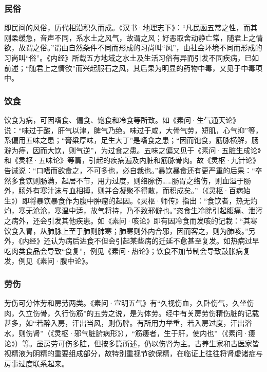\documentclass[12pt]{ctexbook}
\begin{document}
\subsubsection{民俗}%

即民间的风俗，历代相沿积久而成。《汉书·地理志下》：“凡民函五常之性，而其刚柔缓急，音声不同，系水土之风气，故谓之风；好恶取舍动静亡常，随君上之情欲，故谓之俗。”谓由自然条件不同而形成的习尚叫“风”，由社会环境不同而形成的习尚叫“俗”。《内经》所载五方地域之水土及生活习俗有异而引发不同疾病，已如前述；“随君上之情欲”而兴起服石之风，其后果为明显的药物中毒，又见于中毒项中。

\subsubsection{饮食}%

饮食为病，可因嗜食、偏食、饱食和冷食等所致。如《素问·生气通天论》说：“味过于酸，肝气以津，脾气乃绝。味过于咸，大骨气劳，短肌，心气抑”等，系偏用五味之患；“膏粱厚味，足生大丁”是嗜食之患；“因而饱食，筋脉横解，肠澼为痔，因而大饮，则气逆”，为过食之患。五味之偏又见于《素问·五脏生成论》和《灵枢·五味论》等篇，引起的疾病遍及内脏和筋脉骨肉。故《灵枢·九针论》告诫说：“口嗜而欲食之，不可多也，必自裁也。”暴饮暴食还有更严重的后果：“卒然多食饮则肠满，起居不节，用力过度，则络脉伤……肠胃之络伤，则血溢于肠外，肠外有寒汁沫与血相搏，则并合凝聚不得散，而积成矣。”（《灵枢·百病始生》）即将暴饮暴食作为腹中肿瘤的起因。《灵枢·师传》指出：“食饮者，热无灼灼，寒无沧沧，寒温中适，故气将持，乃不致邪僻也。”恣食生冷除引起腹痛、泄泻之病外，还会引发其他疾患。如《素问·咳论》即有因冷食而发咳的记栽：“其寒饮食入胃，从肺脉上至于肺则肺寒；肺寒则外内合邪，因而客之，则为肺咳。”另外，《内经》还认为病后进食不但会引起某些病的迁延不愈甚至复发。如热病过早吃肉类食品会导致“食复”，例见《素问·热论》；饮食不加节制会导致鼓胀病复发，例见《素问·腹中论》。

\subsubsection{劳伤}%

劳伤可分体劳和房劳两类。《素问·宣明五气》有“久视伤血，久卧伤气，久坐伤肉，久立伤骨，久行伤筋”的五劳之说，是为体劳。经中有关房劳伤精伤脏的记载甚多，如“若醉入房，汗出当风，则伤脾。有所用力举重，若入房过度，汗出浴水，则伤肾”（《灵枢·邪气脏腑病形》），“筋痿者，生于肝，使内也”（《素问·痿论》）等。虽房劳可伤多脏，但按多篇所述，仍以伤肾为主。古养生家和古医家皆视精液为阴精的重要组成部分，故特别重视节欲保精，在临证上往往将肾虚诸症与房事过度联系起来。
\end{document}

